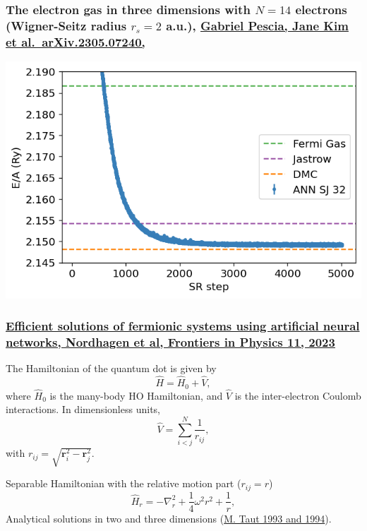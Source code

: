\documentclass{beamer}
\begin{document}
\begin{frame}
\frametitle{The electron gas in three dimensions with $N=14$ electrons (Wigner-Seitz radius $r_s=2$ a.u.), \href{{https://doi.org/10.48550/arXiv.2305.07240}}{Gabriel Pescia, Jane Kim et al.~arXiv.2305.07240,}}

\begin{block}{}

\vspace{6mm}

\centerline{\includegraphics[width=0.9\linewidth]{figures/elgasnew.png}}

\vspace{6mm}

\end{block}
\end{frame}

\begin{frame}
\frametitle{\href{{https://doi.org/10.3389/fphy.2023.1061580}}{Efficient solutions of fermionic systems using artificial neural networks, Nordhagen et al, Frontiers in Physics 11, 2023}}

The Hamiltonian of the quantum dot is given by
\[ \hat{H} = \hat{H}_0 + \hat{V}, 
\]
where $\hat{H}_0$ is the many-body HO Hamiltonian, and $\hat{V}$ is the
inter-electron Coulomb interactions. In dimensionless units,
\[ \hat{V}= \sum_{i < j}^N \frac{1}{r_{ij}},
\]
with $r_{ij}=\sqrt{\mathbf{r}_i^2 - \mathbf{r}_j^2}$.

Separable Hamiltonian with the relative motion part ($r_{ij}=r$)
\[ 
\hat{H}_r=-\nabla^2_r + \frac{1}{4}\omega^2r^2+ \frac{1}{r},
\]
Analytical solutions in two and three dimensions (\href{{https://journals.aps.org/pra/abstract/10.1103/PhysRevA.48.3561}}{M. Taut 1993 and 1994}).
\end{frame}
\end{document}

